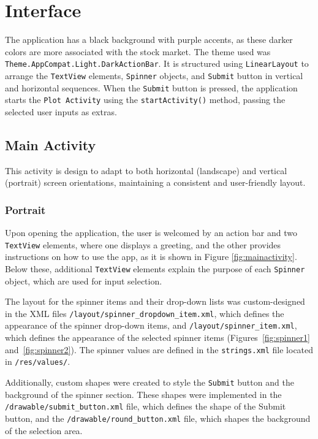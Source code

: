 \documentclass{article}
\begin{document}
\section{Interface}
The application has a black background with purple accents, as these darker colors are more associated with the stock market. The theme used was \texttt{Theme.AppCompat.Light.DarkActionBar}.
It is structured using \texttt{LinearLayout} to arrange the \texttt{TextView} elements, \texttt{Spinner} objects, and \texttt{Submit} button in vertical and horizontal sequences. When the \texttt{Submit} button is pressed, the application starts the \texttt{Plot Activity} using the \texttt{startActivity()} method, passing the selected user inputs as extras.

\subsection{Main Activity}
This activity is design to adapt to both horizontal (landscape) and vertical (portrait) screen orientations, maintaining a consistent and user-friendly layout.
\subsubsection{Portrait}
Upon opening the application, the user is welcomed by an action bar and two \texttt{TextView} elements, where one displays a greeting, and the other provides instructions on how to use the app, as it is shown in Figure \ref{fig:mainactivity}. 
Below these, additional \texttt{TextView} elements explain the purpose of each \texttt{Spinner} object, which are used for input selection.

The layout for the spinner items and their drop-down lists was custom-designed in the XML files \texttt{/layout/spinner\_dropdown\_item.xml}, which defines the appearance of the spinner drop-down items, and \texttt{/layout/spinner\_item.xml}, which defines the appearance of the selected spinner items (Figures~\ref{fig:spinner1} and~\ref{fig:spinner2}). 
The spinner values are defined in the \texttt{strings.xml} file located in \texttt{/res/values/}. 


Additionally, custom shapes were created to style the \texttt{Submit} button and the background of the spinner section. 
These shapes were implemented in the \texttt{/drawable/submit\_button.xml} file, which defines the shape of the Submit button, and the \texttt{/drawable/round\_button.xml} file, which shapes the background of the selection area.
\end{document}
